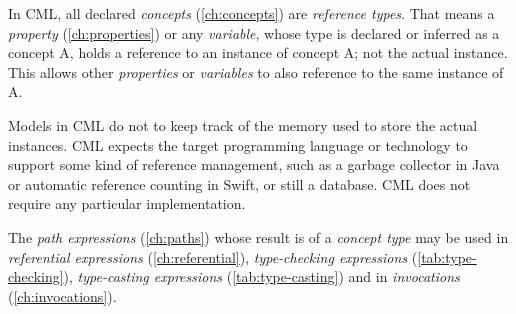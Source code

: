 In CML, all declared \emph{concepts} (\ref{ch:concepts}) are \emph{reference types}.
That means a \emph{property} (\ref{ch:properties}) or any \emph{variable},
whose type is declared or inferred as a concept A, holds a reference
to an instance of concept A; not the actual instance.
This allows other \emph{properties} or \emph{variables}
to also reference to the same instance of A.

Models in CML do not to keep track of the memory used
to store the actual instances.
CML expects the target programming language or technology
to support some kind of reference management,
such as a garbage collector in Java or automatic reference counting in Swift,
or still a database.
CML does not require any particular implementation.

The \emph{path expressions} (\ref{ch:paths})
whose result is of a \emph{concept type} may be used
in \emph{referential expressions} (\ref{ch:referential}),
\emph{type-checking expressions} (\ref{tab:type-checking}),
\emph{type-casting expressions} (\ref{tab:type-casting})
and in \emph{invocations} (\ref{ch:invocations}).
